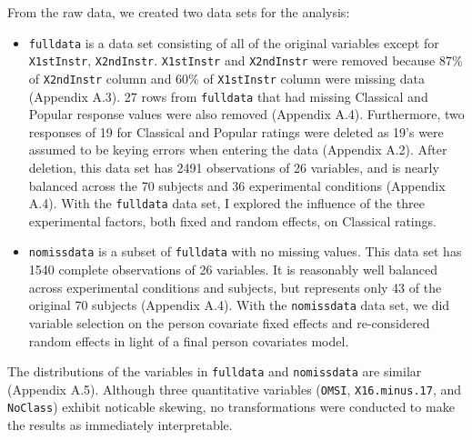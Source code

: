 \documentclass{article}
\begin{document}
From the raw data, we created two data sets for the analysis:
\begin{itemize}
\item \texttt{fulldata} is a data set consisting of all of the original variables except for \texttt{X1stInstr}, \texttt{X2ndInstr}. \texttt{X1stInstr} and \texttt{X2ndInstr} were removed because 87\% of \texttt{X2ndInstr} column and 60\% of \texttt{X1stInstr} column were missing data (Appendix A.3). 27 rows from \texttt{fulldata} that had missing Classical and Popular response values were also removed (Appendix A.4). Furthermore, two responses of 19 for Classical and Popular ratings were deleted as 19's were assumed to be keying errors when entering the data (Appendix A.2). After deletion, this data set has 2491 observations of 26 variables, and is nearly balanced across the 70 subjects and 36 experimental conditions (Appendix A.4). With the \texttt{fulldata} data set, I explored the influence of the three experimental factors, both fixed and random effects, on Classical ratings.
\item \texttt{nomissdata} is a subset of \texttt{fulldata} with no missing values. This data set has 1540 complete observations of 26 variables.  It is reasonably well balanced across experimental conditions and subjects, but represents only 43 of the original 70 subjects (Appendix A.4). With the \texttt{nomissdata} data set, we did variable selection on the person covariate fixed effects and re-considered random effects in light of a final person covariates model.
\end{itemize}

The distributions of the variables in \texttt{fulldata} and \texttt{nomissdata} are similar (Appendix A.5).  Although three quantitative variables (\texttt{OMSI}, \texttt{X16.minus.17}, and \texttt{NoClass}) exhibit noticable skewing, no transformations were conducted to make the results as immediately interpretable.
\end{document}
